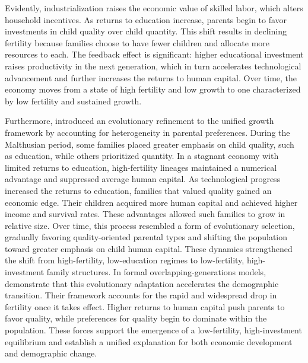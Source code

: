 \documentclass[]{AEA}
\begin{document}
Evidently, industrialization raises the economic value of skilled labor,
which alters household incentives. As returns to education increase,
parents begin to favor investments in child quality over child quantity.
This shift results in declining fertility because families choose to
have fewer children and allocate more resources to each. The feedback
effect is significant: higher educational investment raises productivity
in the next generation, which in turn accelerates technological
advancement and further increases the returns to human capital. Over
time, the economy moves from a state of high fertility and low growth to
one characterized by low fertility and sustained growth.

Furthermore, \citet{galor2002natural} introduced an evolutionary
refinement to the unified growth framework by accounting for
heterogeneity in parental preferences. During the Malthusian period,
some families placed greater emphasis on child quality, such as
education, while others prioritized quantity. In a stagnant economy with
limited returns to education, high-fertility lineages maintained a
numerical advantage and suppressed average human capital. As
technological progress increased the returns to education, families that
valued quality gained an economic edge. Their children acquired more
human capital and achieved higher income and survival rates. These
advantages allowed such families to grow in relative size. Over time,
this process resembled a form of evolutionary selection, gradually
favoring quality-oriented parental types and shifting the population
toward greater emphasis on child human capital. These dynamics
strengthened the shift from high-fertility, low-education regimes to
low-fertility, high-investment family structures. In formal
overlapping-generations models, \citet{galor2002natural} demonstrate
that this evolutionary adaptation accelerates the demographic
transition. Their framework accounts for the rapid and widespread drop
in fertility once it takes effect. Higher returns to human capital push
parents to favor quality, while preferences for quality begin to
dominate within the population. These forces support the emergence of a
low-fertility, high-investment equilibrium and establish a unified
explanation for both economic development and demographic change.
\end{document}
